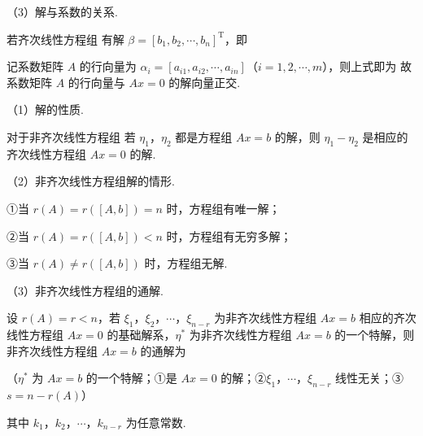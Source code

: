 （3）解与系数的关系.

若齐次线性方程组
有解 $\beta=[b_1,b_2,\cdots,b_n]^{\mathrm T}$，即


记系数矩阵 $A$ 的行向量为 $\alpha_i=[a_{i1},a_{i2},\cdots,a_{in}]$（$i=1,2,\cdots,m$），则上式即为
故系数矩阵 $A$ 的行向量与 $Ax=0$ 的解向量正交.


（1）解的性质.

对于非齐次线性方程组
若 $\eta_1$，$\eta_2$ 都是方程组 $Ax=b$ 的解，则 $\eta_1-\eta_2$ 是相应的齐次线性方程组 $Ax=0$ 的解.

（2）非齐次线性方程组解的情形.


①当 $r(A)=r([A,b])=n$ 时，方程组有唯一解；

②当 $r(A)=r([A,b])<n$ 时，方程组有无穷多解；

③当 $r(A)\ne r([A,b])$ 时，方程组无解.

（3）非齐次线性方程组的通解.

设 $r(A)=r<n$，若 $\xi_1$，$\xi_2$，$\cdots$，$\xi_{n-r}$ 为非齐次线性方程组 $Ax=b$ 相应的齐次线性方程组 $Ax=0$ 的基础解系，$\eta^*$ 为非齐次线性方程组 $Ax=b$ 的一个特解，则非齐次线性方程组 $Ax=b$ 的通解为

（$\eta^*$ 为 $Ax=b$ 的一个特解；①是 $Ax=0$ 的解；②$\xi_1$，$\cdots$，$\xi_{n-r}$ 线性无关；③ $s=n-r(A)$）

其中 $k_1$，$k_2$，$\cdots$，$k_{n-r}$ 为任意常数.

